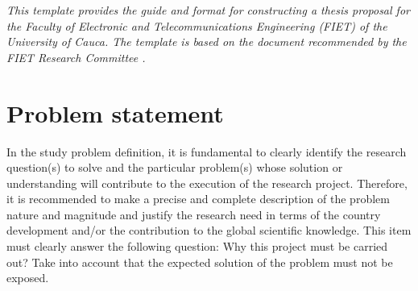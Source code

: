 \textit{This template \cite{estrada-solano_2018:github} provides the guide and format for constructing a thesis proposal for the Faculty of Electronic and Telecommunications Engineering (FIET) of the University of Cauca. The template is based on the document recommended by the FIET Research Committee \cite{fiet_2011:guide_thesis_proposal}.}

\section{Problem statement}
\label{sec:problem_statement}

In the study problem definition, it is fundamental to clearly identify the research question(s) to solve and the particular problem(s) whose solution or understanding will contribute to the execution of the research project. Therefore, it is recommended to make a precise and complete description of the problem nature and magnitude and justify the research need in terms of the country development and/or the contribution to the global scientific knowledge. This item must clearly answer the following question: Why this project must be carried out? Take into account that the expected solution of the problem must not be exposed.

